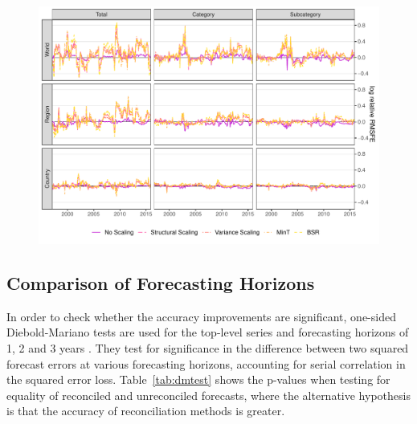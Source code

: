 \documentclass[a4paper,fleqn,11pt]{article}
\begin{document}
\begin{figure}[H]
	\includegraphics[width=\textwidth]{fig/fig_eval_rmse_time}
	\label{fig:rmse_time}
\end{figure}

\subsection{Comparison of Forecasting Horizons}
In order to check whether the accuracy improvements are significant, one-sided Diebold-Mariano tests are used for the top-level series and forecasting horizons of 1, 2 and 3 years \citep{Diebold1995}. They test for significance in the difference between two squared forecast errors at various forecasting horizons, accounting for serial correlation in the squared error loss. Table~\ref{tab:dmtest} shows the p-values when testing for equality of reconciled and unreconciled forecasts, where the alternative hypothesis is that the accuracy of reconciliation methods is greater. 
\end{document}
